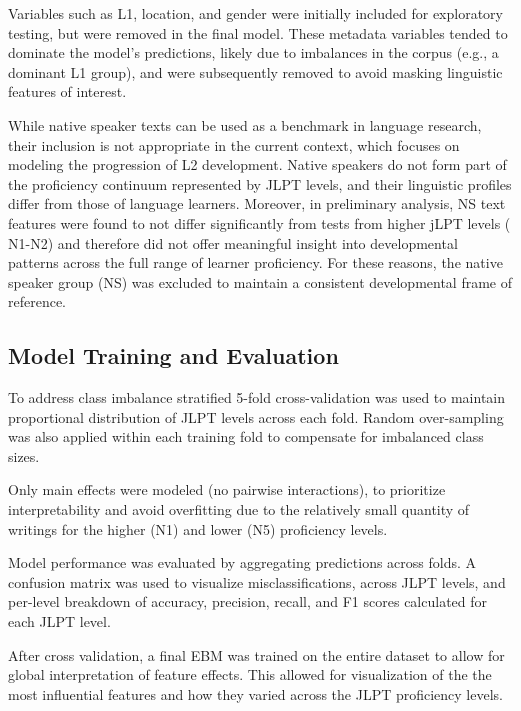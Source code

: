 Variables such as L1, location, and gender were initially included for
exploratory
testing, but were removed in the final model. These metadata variables  tended to dominate the model's
predictions, likely due to imbalances in the corpus (e.g., a dominant L1 group), and were subsequently removed to avoid
masking linguistic features of interest.

While native speaker texts can be used as a benchmark in language research, their inclusion is not appropriate in
the current context, which focuses on modeling the progression of L2 development. Native speakers do not form part of
the proficiency continuum represented by JLPT levels, and their linguistic profiles differ from those
of language learners. Moreover, in preliminary analysis, NS text features were found to not differ significantly from
tests from higher jLPT levels (
N1-N2) and therefore did
not offer meaningful insight into developmental patterns across the full range of learner proficiency. For these
reasons, the native speaker group (NS) was excluded to maintain a consistent developmental frame of reference.

\subsection{Model Training and Evaluation}

To address class imbalance stratified 5-fold cross-validation was used to maintain proportional distribution of JLPT
levels across each fold. Random over-sampling was also applied within each training fold to compensate for
imbalanced class sizes.

Only main effects were modeled (no pairwise interactions), to prioritize interpretability and avoid overfitting
due to the relatively small quantity of writings for the higher (N1) and lower (N5) proficiency levels.

Model performance was evaluated by aggregating predictions across folds. A confusion
matrix was used to visualize misclassifications,
across JLPT levels, and per-level breakdown of accuracy, precision, recall, and F1 scores calculated for each JLPT
level.

After cross validation, a final EBM was trained on the entire dataset to allow for global interpretation of feature
effects. This allowed for visualization of the
the most influential features and how they varied across
the JLPT proficiency levels.




